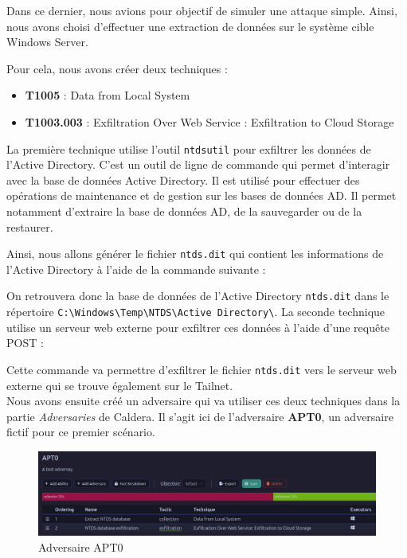 \documentclass[12pt,letterpaper]{article}
\begin{document}
Dans ce dernier, nous avions pour objectif de simuler une attaque simple.
Ainsi, nous avons choisi d'effectuer une extraction de données sur le système cible Windows Server.

Pour cela, nous avons créer deux techniques :
\begin{itemize}
    \item \textbf{T1005} : Data from Local System
    \item \textbf{T1003.003} : Exfiltration Over Web Service : Exfiltration to Cloud Storage
\end{itemize}

La première technique utilise l'outil \verb|ntdsutil| pour exfiltrer les données de l'Active Directory.
C'est un outil de ligne de commande qui permet d'interagir avec la base de données Active Directory.
Il est utilisé pour effectuer des opérations de maintenance et de gestion sur les bases de données AD.
Il permet notamment d'extraire la base de données AD, de la sauvegarder ou de la restaurer.

Ainsi, nous allons générer le fichier \verb|ntds.dit| qui contient les informations de l'Active Directory à l'aide de la commande suivante :


On retrouvera donc la base de données de l'Active Directory \verb|ntds.dit| dans le répertoire \verb|C:\Windows\Temp\NTDS\Active Directory\|.
La seconde technique utilise un serveur web externe pour exfiltrer ces données à l'aide d'une requête POST :

Cette commande va permettre d'exfiltrer le fichier \verb|ntds.dit| vers le serveur web externe qui se trouve également sur le Tailnet. \\

Nous avons ensuite créé un adversaire qui va utiliser ces deux techniques dans la partie \textit{Adversaries} de Caldera.
Il s'agit ici de l'adversaire \textbf{APT0}, un adversaire fictif pour ce premier scénario.

\begin{figure}[h!]
    \centering
    \includegraphics[width=1\textwidth]{images/caldera/apt0_adversary.png}
    \caption{Adversaire APT0}
    \label{fig:apt0_adversary}
\end{figure}
\end{document}
